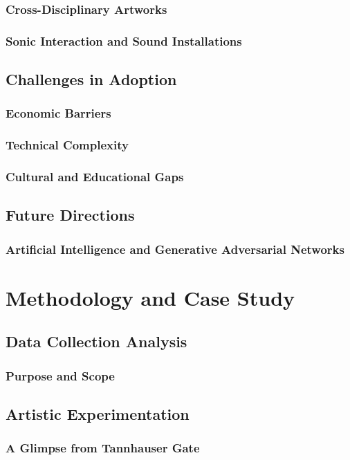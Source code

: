 \documentclass[a4paper, 12pt]{report}
\begin{document}
        \subsection{Cross-Disciplinary Artworks}
        \subsection{Sonic Interaction and Sound Installations}
    \section{Challenges in Adoption}
        \subsection{Economic Barriers}
        \subsection{Technical Complexity}
        \subsection{Cultural and Educational Gaps}
    \section{Future Directions}
        \subsection{Artificial Intelligence and Generative Adversarial Networks}


\chapter{Methodology and Case Study}
    \section{Data Collection Analysis}
        \subsection{Purpose and Scope}
    \section{Artistic Experimentation}
        \subsection{A Glimpse from Tannhauser Gate}
\end{document}

